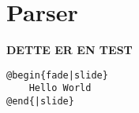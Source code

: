 \chapter{Parser}

\textbf{DETTE ER EN TEST}

\begin{lstlisting}
@begin{fade|slide}
	Hello World
@end{|slide}
\end{lstlisting}